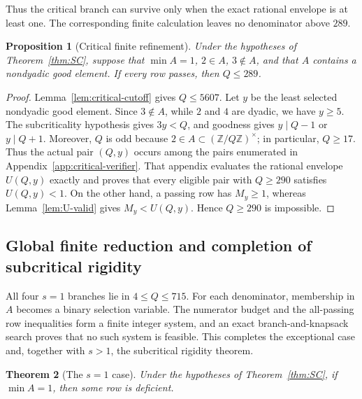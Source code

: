 \documentclass[11pt]{article}
\newtheorem{theorem}{Theorem}[section]
\newtheorem{proposition}[theorem]{Proposition}
\theoremstyle{definition}
\theoremstyle{remark}
\newcommand{\U}{(\mathbb Z/Q\mathbb Z)^\times}
\begin{document}
Thus the critical branch can survive only when the exact rational envelope
is at least one.  The corresponding finite calculation leaves no denominator
above \(289\).

\begin{proposition}[Critical finite refinement]\label{prop:critical-289}
Under the hypotheses of Theorem~\ref{thm:SC}, suppose that
\(\min A=1\), \(2\in A\), \(3\notin A\), and that \(A\) contains a
nondyadic good element.  If every row passes, then \(Q\le289\).
\end{proposition}

\begin{proof}
Lemma~\ref{lem:critical-cutoff} gives \(Q\le5607\).  Let \(y\) be the
least selected nondyadic good element.  Since \(3\notin A\), while \(2\)
and \(4\) are dyadic, we have \(y\ge5\).  The subcriticality hypothesis
gives \(3y<Q\), and goodness gives \(y\mid Q-1\) or \(y\mid Q+1\).
Moreover, \(Q\) is odd because \(2\in A\subset\U\); in particular,
\(Q\ge17\).  Thus the actual pair \((Q,y)\) occurs among the pairs
enumerated in Appendix~\ref{app:critical-verifier}.  That appendix
evaluates the rational envelope \(U(Q,y)\) exactly and proves that every
eligible pair with \(Q\ge290\) satisfies \(U(Q,y)<1\).  On the other hand,
a passing row has \(M_y\ge1\), whereas Lemma~\ref{lem:U-valid} gives
\(M_y<U(Q,y)\).  Hence \(Q\ge290\) is impossible.
\end{proof}

\subsection{Global finite reduction and completion of subcritical rigidity}

All four \(s=1\) branches lie in \(4\le Q\le715\).  For each
denominator, membership in \(A\) becomes a binary selection variable.  The
numerator budget and the all-passing row inequalities form a finite integer
system, and an exact branch-and-knapsack search proves that no such system is
feasible.  This completes the exceptional case and, together with \(s>1\),
the subcritical rigidity theorem.

\begin{theorem}[The \(s=1\) case]\label{thm:s-one}
Under the hypotheses of Theorem~\ref{thm:SC}, if \(\min A=1\), then some
row is deficient.
\end{theorem}
\end{document}

